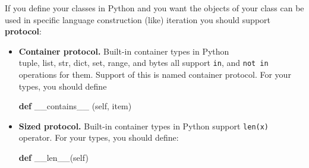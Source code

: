 \documentclass[
]{article}
\newenvironment{Shaded}{}{}
\newcommand{\FunctionTok}[1]{\textcolor[rgb]{0.02,0.16,0.49}{#1}}
\newcommand{\KeywordTok}[1]{\textcolor[rgb]{0.00,0.44,0.13}{\textbf{#1}}}
\newcommand{\NormalTok}[1]{#1}
\newcommand{\VariableTok}[1]{\textcolor[rgb]{0.10,0.09,0.49}{#1}}
\begin{document}
If you define your classes in Python and you want the objects of your
class can be used in specific language construction (like) iteration you
should support \textbf{protocol}:

\begin{itemize}
\item
  \textbf{Container protocol.} Built-in container types in Python\\
  tuple, list, str, dict, set, range, and bytes all support \texttt{in},
  and \texttt{not\ in} operations for them. Support of this is named
  container protocol. For your types, you should define

\begin{Shaded}
\begin{Highlighting}[]
\KeywordTok{def} \FunctionTok{\_\_contains\_\_}\NormalTok{ (}\VariableTok{self}\NormalTok{, item)}
\end{Highlighting}
\end{Shaded}
\item
  \textbf{Sized protocol.} Built-in container types in Python support
  \texttt{len(x)} operator. For your types, you should define:

\begin{Shaded}
\begin{Highlighting}[]
\KeywordTok{def} \FunctionTok{\_\_len\_\_}\NormalTok{(}\VariableTok{self}\NormalTok{)}
\end{Highlighting}
\end{Shaded}
\end{itemize}
\end{document}
